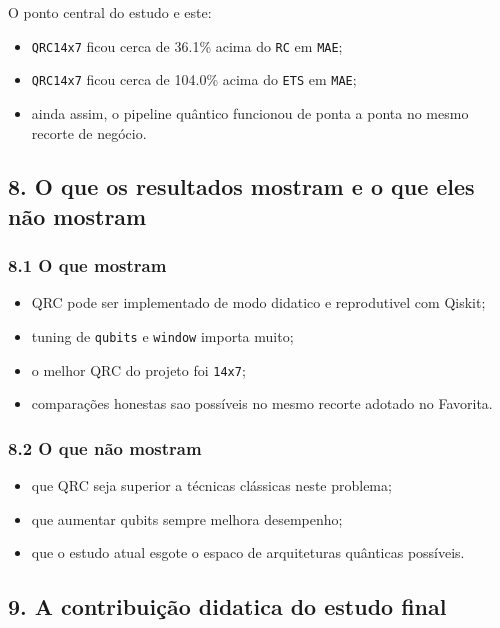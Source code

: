 \documentclass[12pt]{article}
\providecommand{\tightlist}{%
          \setlength{\itemsep}{0pt}\setlength{\parskip}{0pt}}
\begin{document}
O ponto central do estudo e este:

\begin{itemize}
\tightlist
\item
  \texttt{QRC14x7} ficou cerca de 36.1\% acima do \texttt{RC} em \texttt{MAE};
\item
  \texttt{QRC14x7} ficou cerca de 104.0\% acima do \texttt{ETS} em \texttt{MAE};
\item
  ainda assim, o pipeline quântico funcionou de ponta a ponta no mesmo recorte de negócio.
\end{itemize}

\subsection{8. O que os resultados mostram e o que eles não mostram}\label{8-o-que-os-resultados-mostram-e-o-que-eles-nuxe3o-mostram}

\subsubsection{8.1 O que mostram}\label{81-o-que-mostram}

\begin{itemize}
\tightlist
\item
  QRC pode ser implementado de modo didatico e reprodutivel com Qiskit;
\item
  tuning de \texttt{qubits} e \texttt{window} importa muito;
\item
  o melhor QRC do projeto foi \texttt{14x7};
\item
  comparações honestas sao possíveis no mesmo recorte adotado no Favorita.
\end{itemize}

\subsubsection{8.2 O que não mostram}\label{82-o-que-nuxe3o-mostram}

\begin{itemize}
\tightlist
\item
  que QRC seja superior a técnicas clássicas neste problema;
\item
  que aumentar qubits sempre melhora desempenho;
\item
  que o estudo atual esgote o espaco de arquiteturas quânticas possíveis.
\end{itemize}

\subsection{9. A contribuição didatica do estudo final}\label{9-a-contribuiuxe7uxe3o-didatica-do-estudo-final}
\end{document}
